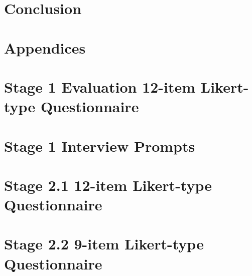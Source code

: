 \documentclass[a4paper]{report}
\begin{document}

\chapter{Conclusion}
\graphicspath{ {06_mirrorshades_studies_results/images/} }



\chapter*{Appendices}


\begin{appendices}

%

\chapter{Stage 1 Evaluation 12-item Likert-type Questionnaire}

\label{appendix-12-item-likert-type-questionnaire-stage-1}

\chapter{Stage 1 Interview Prompts}

\label{appendix-interview-questions-stage-1}

\chapter{Stage 2.1 12-item Likert-type Questionnaire}

\label{appendix-12-item-likert-type-questionnaire-stage-2-1}

\chapter{Stage 2.2 9-item Likert-type Questionnaire}

\label{appendix-9-item-likert-type-questionnaire-stage-2-2}


\end{appendices}
\end{document}
